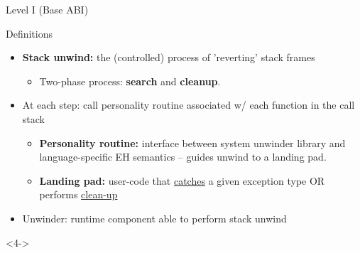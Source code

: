 \begin{frame}{Level I (Base ABI)}
  \begin{block}{Definitions}
    \begin{itemize}
    \item \alert{\bfseries Stack unwind:} the (controlled) process of 'reverting' stack frames
      \begin{itemize}
      \item Two-phase process: \textbf{search} and \textbf{cleanup}.
      \end{itemize}
      \pause

    \item At each step: call personality routine associated w/ each function in the call stack
      \begin{itemize}
      \item \alert{\bfseries Personality routine:} interface between system unwinder library and language-specific EH semantics -- guides unwind to a landing pad.
        \begin{center}
          \resizebox{0.5\textwidth}{!}{}
        \end{center}

      \item \alert{\bfseries Landing pad:} user-code that \underline{catches} a given exception type OR performs \underline{clean-up}
      \end{itemize}
      \medskip
      \pause

    \item Unwinder: runtime component able to perform stack unwind
    \end{itemize}
  \end{block}

  \begin{onlyenv}<4->
  \end{onlyenv}
\end{frame}

